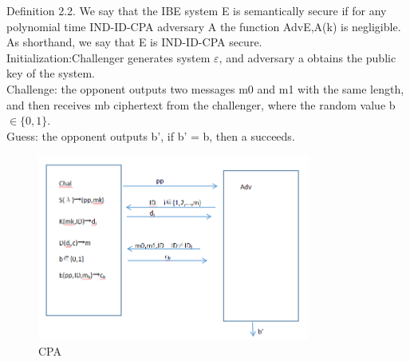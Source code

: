 \documentclass[runningheads,a4paper]{llncs}
\begin{document}
Definition 2.2. We say that the IBE system E is semantically secure if for any polynomial time IND-ID-CPA adversary A the function AdvE,A(k) is negligible. As shorthand, we say that E is IND-ID-CPA secure.\\
Initialization:Challenger generates system $\varepsilon$, and adversary a obtains the public key of the system.\\
Challenge: the opponent outputs two messages m0 and m1 with the same length, and then receives mb ciphertext from the challenger, where the random value b$\in \{ 0,1 \}$.\\
Guess: the opponent outputs b’, if b’ = b, then a succeeds.
\begin{figure}[H]
		\centering %
		\includegraphics[width=0.8\textwidth]{./figure/CPA} %
		\caption{CPA} %
		\label{a} %

\end{figure}
\end{document}
